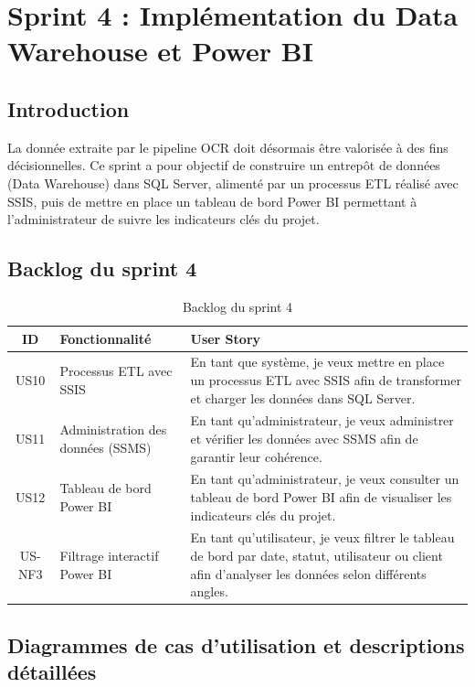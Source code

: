\chapter{Sprint 4 : Implémentation du Data Warehouse et Power BI}

\section*{Introduction}
La donnée extraite par le pipeline OCR doit désormais être valorisée à des fins
décisionnelles. Ce sprint a pour objectif de construire un entrepôt de données
(Data Warehouse) dans SQL Server, alimenté par un processus ETL réalisé avec SSIS,
puis de mettre en place un tableau de bord Power BI permettant à l'administrateur de
suivre les indicateurs clés du projet.

\section{Backlog du sprint 4}
\begin{table}[h!]
\centering
\caption{Backlog du sprint 4}
\label{tab:backlog-sprint4}
\renewcommand{\arraystretch}{1.3}
\begin{tabularx}{\textwidth}{|c|l|X|}
\hline
\textbf{ID} & \textbf{Fonctionnalité} & \textbf{User Story} \\ \hline
US10 & Processus ETL avec SSIS &
En tant que système, je veux mettre en place un processus ETL avec SSIS afin de
transformer et charger les données dans SQL Server. \\ \hline
US11 & Administration des données (SSMS) &
En tant qu'administrateur, je veux administrer et vérifier les données avec SSMS
afin de garantir leur cohérence. \\ \hline
US12 & Tableau de bord Power BI &
En tant qu'administrateur, je veux consulter un tableau de bord Power BI afin de
visualiser les indicateurs clés du projet. \\ \hline
US-NF3 & Filtrage interactif Power BI &
En tant qu'utilisateur, je veux filtrer le tableau de bord par date, statut,
utilisateur ou client afin d'analyser les données selon différents angles. \\ \hline
\end{tabularx}
\end{table}

\section{Diagrammes de cas d'utilisation et descriptions détaillées}


